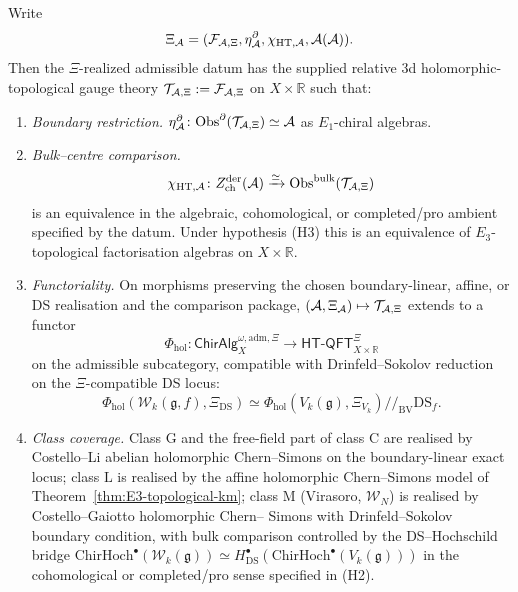 \begin{theorem}
Write
\[
\Xi_{\mathcal{A}}=(\mathcal F_{\mathcal{A},\Xi},\eta^\partial_{\mathcal{A}},
\chi_{\mathrm{HT},\mathcal{A}},\mathcal A(\mathcal{A})).
\]
Then the \(\Xi\)-realized admissible datum has the supplied relative
$3$d holomorphic-topological gauge theory
\(\mathcal{T}_{\mathcal{A},\Xi}:=\mathcal F_{\mathcal{A},\Xi}\) on
$X\times\mathbb{R}$ such that:
\begin{enumerate}
\item[(i)] \emph{Boundary restriction.}
\(\eta^\partial_{\mathcal{A}}\colon
\mathrm{Obs}^\partial(\mathcal{T}_{\mathcal{A},\Xi})\simeq \mathcal{A}\)
as $E_1$-chiral algebras.
\item[(ii)] \emph{Bulk--centre comparison.}
\[
\chi_{\mathrm{HT},\mathcal{A}}\colon
Z^{\mathrm{der}}_{\mathrm{ch}}(\mathcal{A})\xrightarrow{\simeq}
\mathrm{Obs}^{\mathrm{bulk}}(\mathcal{T}_{\mathcal{A},\Xi})
\]
is an equivalence in the algebraic, cohomological, or completed/pro
ambient specified by the datum. Under hypothesis \textup{(H3)} this is an
equivalence of $E_3$-topological factorisation algebras on
$X\times\mathbb{R}$.
\item[(iii)] \emph{Functoriality.} On morphisms preserving the chosen
boundary-linear, affine, or DS realisation and the comparison package,
\((\mathcal{A},\Xi_{\mathcal{A}})\mapsto \mathcal{T}_{\mathcal{A},\Xi}\)
extends to a functor
\[
 \Phi_{\mathrm{hol}}\colon
 \mathsf{ChirAlg}^{\omega,\mathrm{adm},\Xi}_X
 \longrightarrow
 \mathsf{HT\text{-}QFT}^{\Xi}_{X\times\mathbb{R}}
\]
on the admissible subcategory, compatible with Drinfeld--Sokolov
reduction on the \(\Xi\)-compatible DS locus:
\[
\Phi_{\mathrm{hol}}(\mathcal{W}_k(\mathfrak{g},f),\Xi_{\mathrm{DS}})
\simeq
\Phi_{\mathrm{hol}}(V_k(\mathfrak{g}),\Xi_{V_k})
/\!/_{\mathrm{BV}}\mathrm{DS}_f .
\]
\item[(iv)] \emph{Class coverage.} Class $\mathrm{G}$ and the free-field
part of class $\mathrm{C}$ are realised by Costello--Li abelian
holomorphic Chern--Simons on the boundary-linear exact locus; class
$\mathrm{L}$ is realised by the affine holomorphic Chern--Simons model
of Theorem~\ref{thm:E3-topological-km}; class $\mathrm{M}$ (Virasoro,
$\mathcal{W}_N$) is realised by Costello--Gaiotto holomorphic Chern--
Simons with Drinfeld--Sokolov boundary condition, with bulk comparison
controlled by the DS--Hochschild bridge
$\mathrm{ChirHoch}^\bullet(\mathcal{W}_k(\mathfrak{g}))\simeq
H^\bullet_{\mathrm{DS}}(\mathrm{ChirHoch}^\bullet(V_k(\mathfrak{g})))$
in the cohomological or completed/pro sense specified in \textup{(H2)}.
\end{enumerate}
\end{theorem}


